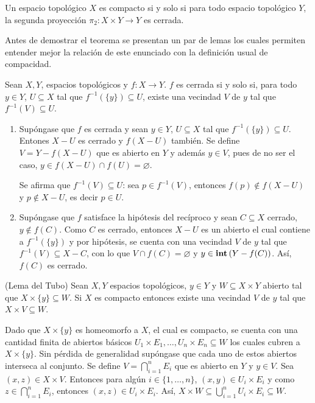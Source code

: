 \begin{Teo}
  Un espacio topológico $X$ es compacto si y solo si
  para todo espacio topológico $Y$, la segunda proyección
  $\pi_2:X\times Y\longrightarrow Y$ es cerrada.
\end{Teo}

Antes de demostrar el teorema se presentan un par de lemas los cuales
permiten entender mejor la relación de este enunciado con la definición
usual de compacidad.

\begin{Lema}
  Sean $X,Y$, espacios topológicos y $f:X\longrightarrow Y$.
  $f$ es cerrada si y solo si, para todo $y\in Y$, $U\subseteq X$
  tal que $f^{-1}(\{y\})\subseteq U$, existe una vecindad $V$ de $y$
  tal que $f^{-1}(V)\subseteq U$.
\end{Lema}
\begin{Demo}
  \begin{enumerate}
    \item Supóngase que $f$ es cerrada y sean $y\in Y$, $U\subseteq X$ tal que $f^{-1}(\{y\})\subseteq U$.
    Entones $X-U$ es cerrado y $f(X-U)$ también. Se define $V=Y-f(X-U)$ que es abierto en $Y$ y además
    $y\in V$, pues de no ser el caso, $y\in f(X-U)\cap f(U)=\varnothing$.

    Se afirma que $f^{-1}(V)\subseteq U$: sea $p\in f^{-1}(V)$, entonces $f(p)\not\in f(X-U)$ y
    $p\not\in X-U$, es decir $p\in U$.
    \item Supóngase que $f$ satisface la hipótesis del recíproco y sean $C\subseteq X$ cerrado, $y\not\in f(C)$.
    Como $C$ es cerrado, entonces $X-U$ es un abierto el cual contiene a $f^{-1}(\{y\})$ y por hipótesis,
    se cuenta con una vecindad $V$ de $y$ tal que $f^{-1}(V)\subseteq X-C$, con lo que
    $V\cap f(C)=\varnothing$ y $y\in\Int(Y-f(C))$. Así, $f(C)$ es cerrado.
  \end{enumerate}
\end{Demo}

\begin{Lema}(Lema del Tubo)
  Sean $X,Y$ espacios topológicos, $y\in Y$ y $W\subseteq X\times Y$ abierto tal que
  $X\times\{y\}\subseteq W$. Si $X$ es compacto entonces existe una vecindad $V$ de $y$ tal
  que $X\times V\subseteq W$.
\end{Lema}
\begin{Demo}
  Dado que $X\times\{y\}$ es homeomorfo a $X$, el cual es compacto, se cuenta con
  una cantidad finita de abiertos básicos $U_1\times E_1,\dots,U_n\times E_n\subseteq W$
  los cuales cubren a $X\times\{y\}$. Sin pérdida de generalidad supóngase que
  cada uno de estos abiertos interseca al conjunto. Se define
  $V=\bigcap_{i=1}^n E_i$ que es abierto en $Y$ y $y\in V$. Sea $(x,z)\in X\times V$.
  Entonces para algún $i\in\{1,\dots,n\}$, $(x,y)\in U_i\times E_i$ y como
  $z\in\bigcap_{i=1}^n E_i$, entonces $(x,z)\in U_i\times E_i$. Así,
  $X\times W\subseteq\bigcup_{i=1}^nU_i\times E_i\subseteq W$.
\end{Demo}

